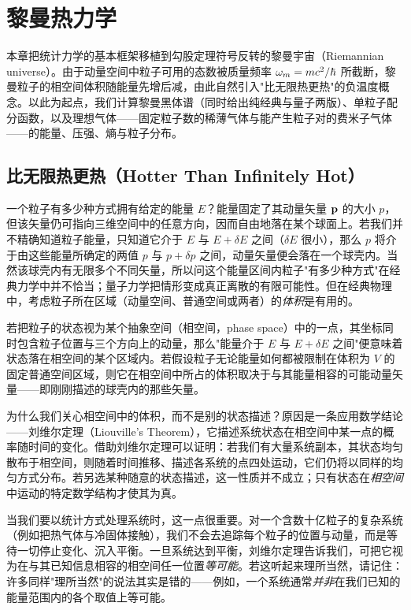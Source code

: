 \chapter{黎曼热力学}

本章把统计力学的基本框架移植到勾股定理符号反转的黎曼宇宙（Riemannian universe）。由于动量空间中粒子可用的态数被质量频率 $\omega_m=mc^{2}/\hbar$ 所截断，黎曼粒子的相空间体积随能量先增后减，由此自然引入"比无限热更热"的负温度概念。以此为起点，我们计算黎曼黑体谱（同时给出纯经典与量子两版）、单粒子配分函数，以及理想气体——固定粒子数的稀薄气体与能产生粒子对的费米子气体——的能量、压强、熵与粒子分布。

\section{比无限热更热（Hotter Than Infinitely Hot）}

一个粒子有多少种方式拥有给定的能量 $E$？能量固定了其动量矢量 $\mathbf{p}$ 的大小 $p$，但该矢量仍可指向三维空间中的任意方向，因而自由地落在某个球面上。若我们并不精确知道粒子能量，只知道它介于 $E$ 与 $E+\delta E$ 之间（$\delta E$ 很小），那么 $p$ 将介于由这些能量所确定的两值 $p$ 与 $p+\delta p$ 之间，动量矢量便会落在一个球壳内。当然该球壳内有无限多个不同矢量，所以问这个能量区间内粒子"有多少种方式"在经典力学中并不恰当；量子力学把情形变成真正离散的有限可能性。但在经典物理中，考虑粒子所在区域（动量空间、普通空间或两者）的\emph{体积}是有用的。


若把粒子的状态视为某个抽象空间（相空间，phase space）中的一点，其坐标同时包含粒子位置与三个方向上的动量，那么"能量介于 $E$ 与 $E+\delta E$ 之间"便意味着状态落在相空间的某个区域内。若假设粒子无论能量如何都被限制在体积为 $V$ 的固定普通空间区域，则它在相空间中所占的体积取决于与其能量相容的可能动量矢量——即刚刚描述的球壳内的那些矢量。

为什么我们关心相空间中的体积，而不是别的状态描述？原因是一条应用数学结论——刘维尔定理（Liouville's Theorem），它描述系统状态在相空间中某一点的概率随时间的变化。借助刘维尔定理可以证明：若我们有大量系统副本，其状态均匀散布于相空间，则随着时间推移、描述各系统的点四处运动，它们仍将以同样的均匀方式分布。若另选某种随意的状态描述，这一性质并不成立；只有状态在\emph{相空间}中运动的特定数学结构才使其为真。

当我们要以统计方式处理系统时，这一点很重要。对一个含数十亿粒子的复杂系统（例如把热气体与冷固体接触），我们不会去追踪每个粒子的位置与动量，而是等待一切停止变化、沉入平衡。一旦系统达到平衡，刘维尔定理告诉我们，可把它视为在与其已知信息相容的相空间任一位置\emph{等可能}。若这听起来理所当然，请记住：许多同样"理所当然"的说法其实是错的——例如，一个系统通常\emph{并非}在我们已知的能量范围内的各个取值上等可能。


